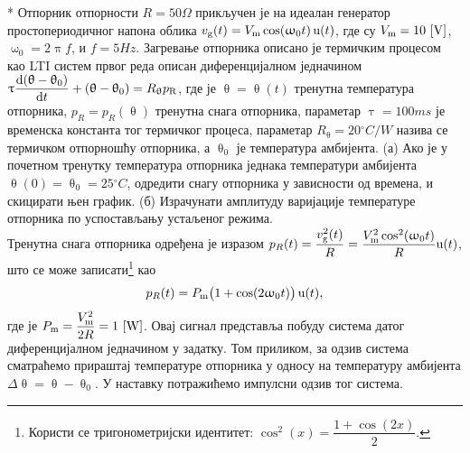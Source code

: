 {\color{red}*}\PID
Отпорник отпорности $R = 50\unit{\Omega}$ прикључен је на идеалан генератор простопериодичног напона облика 
$v_{\rm g}(t) = V_{\rm m} \cos(\upomega_0 t)\,{\rm u}(t)$, где су $V_{\rm m} = 10\,\left[\mathrm{V}\right]$, 
$\upomega_0 = 2\uppi f$, и $f = 5\unit{Hz}$. Загревање отпорника описано је термичким 
процесом као LTI систем првог реда описан диференцијалном једначином 
$\uptau \dfrac{{\rm d} (\uptheta-\uptheta_0)}{{\rm d} t} + (\uptheta-\uptheta_0) = R_{\uptheta} p_{\rm R}$, где је 
$\uptheta = \uptheta(t)$ тренутна температура отпорника, 
$p_R = p_R(\uptheta)$ тренутна снага отпорника, параметар
$\uptau = 100\unit{ms}$ је временска константа тог термичког процеса,
 параметар $R_{\uptheta} = 20\unit{^\circ C/W}$ назива се термичком отпорношћу 
отпорника, а $\uptheta_0$ је температура амбијента. 
(а) Ако је у почетном тренутку температура отпорника једнака температури амбијента $\uptheta(0) = \uptheta_0 = 25\unit{^\circ C}$,
одредити снагу отпорника у зависности од времена, и скицирати њен график. 
(б) Израчунати амплитуду варијације температуре отпорника по успостављању 
устаљеног режима. 
\\[2mm]

\textsc{}
Тренутна снага отпорника одређена је изразом 
$p_{R}(t) = \dfrac{v_{\rm g}^2(t)}{R} = \dfrac{V_{\rm m}^2 \cos^2(\upomega_0 t)}{R} {\rm u}(t)$, што се може 
записати\footnote{
    Користи се тригонометријски идентитет: $\cos^2(x) = \dfrac{1 + \cos(2x)}{2}$.
}
као 
\begin{equation}
    p_{R}(t) = P_{\rm m} \bigl(1 + \cos(2\upomega_0 t) \bigr) \, \uu(t), \label{eq:\ID.1}
\end{equation} 
где је 
$P_{\rm m} = \dfrac{V_{\rm m}^2}{2R} = 1\,\left[\mathrm{W}\right]$. Овај сигнал представља побуду система датог диференцијалном
једначином у задатку. Том приликом, за одзив система сматраћемо прираштај температуре отпорника у односу 
на температуру амбијента $\Delta\uptheta = \uptheta - \uptheta_0$. У наставку потражићемо импулсни одзив тог система. 

